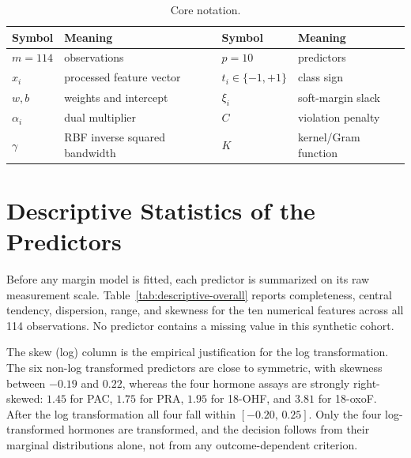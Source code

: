 \documentclass[11pt,a4paper]{article}
\numberwithin{equation}{section} %
\begin{document}
\begin{table}[htbp]
\centering
\caption{Core notation.}
\label{tab:notation}
\begin{tabular}{ll@{\qquad}ll}
\toprule
Symbol & Meaning & Symbol & Meaning \\
\midrule
$m=114$ & observations & $p=10$ & predictors \\
$x_i$ & processed feature vector & $t_i\in\{-1,+1\}$ & class sign \\
$w,b$ & weights and intercept & $\xi_i$ & soft-margin slack \\
$\alpha_i$ & dual multiplier & $C$ & violation penalty \\
$\gamma$ & RBF inverse squared bandwidth & $K$ & kernel/Gram function \\
\bottomrule
\end{tabular}
\end{table}

\section{Descriptive Statistics of the Predictors}
\label{sec:descriptive}

Before any margin model is fitted, each predictor is summarized on its raw
measurement scale. Table~\ref{tab:descriptive-overall} reports completeness,
central tendency, dispersion, range, and skewness for the ten numerical
features across all 114 observations. No predictor contains a missing value in
this synthetic cohort.

\begin{table}[htbp]
\centering
\caption{Descriptive statistics for the ten numerical predictors on the raw
measurement scale. IQR is the interquartile range and Range is the observed
minimum to maximum. Skew is the adjusted Fisher--Pearson skewness; Skew (log)
repeats it after the $\log(x+10^{-6})$ transformation and is shown only for the
four log-transformed hormone assays.}
\label{tab:descriptive-overall}
\small
\setlength{\tabcolsep}{3pt}

\end{table}

The skew (log) column is the empirical justification for the log transformation. The six non-log transformed predictors are close to
symmetric, with skewness between $-0.19$ and $0.22$, whereas the four hormone
assays are strongly right-skewed: $1.45$ for PAC, $1.75$ for PRA, $1.95$ for
18-OHF, and $3.81$ for 18-oxoF. After the log transformation all four fall
within $[-0.20,\,0.25]$. Only the four log-transformed hormones are transformed, and the
decision follows from their marginal distributions alone, not from any
outcome-dependent criterion.
\end{document}
